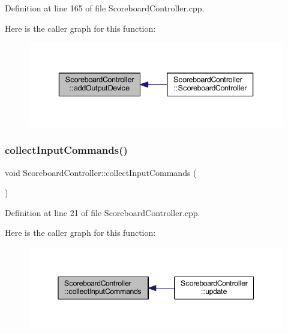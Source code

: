 Definition at line 165 of file Scoreboard\+Controller.\+cpp.

Here is the caller graph for this function\+:\nopagebreak
\begin{figure}[H]
\begin{center}
\leavevmode
\includegraphics[width=336pt]{class_scoreboard_controller_a7b2cc34a33c8203da586ffaab1fb3982_icgraph}
\end{center}
\end{figure}
\mbox{\label{class_scoreboard_controller_a79f3f5a26387ac5daabc34e90dd25e06}} 
\subsubsection{\texorpdfstring{collect\+Input\+Commands()}{collectInputCommands()}}
{\footnotesize\ttfamily void Scoreboard\+Controller\+::collect\+Input\+Commands (\begin{DoxyParamCaption}{ }\end{DoxyParamCaption})}



Definition at line 21 of file Scoreboard\+Controller.\+cpp.

Here is the caller graph for this function\+:\nopagebreak
\begin{figure}[H]
\begin{center}
\leavevmode
\includegraphics[width=345pt]{class_scoreboard_controller_a79f3f5a26387ac5daabc34e90dd25e06_icgraph}
\end{center}
\end{figure}
\mbox{\label{class_scoreboard_controller_a5365e2a960e16cf49dca0852682b0499}} 
